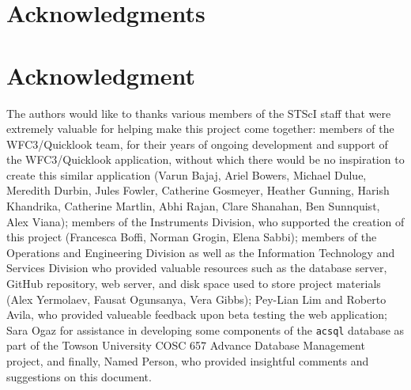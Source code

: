 \documentclass[10pt,journal,compsoc]{IEEEtran}
\begin{document}
\ifCLASSOPTIONcompsoc
  \section*{Acknowledgments}
\else
  \section*{Acknowledgment}
\fi
  The authors would like to thanks various members of the STScI staff that were extremely valuable for helping make this project come together: members of the WFC3/Quicklook team, for their years of
  ongoing development and support of the WFC3/Quicklook application, without which there would be no inspiration to create this similar application (Varun Bajaj, Ariel Bowers, Michael Dulue,
  Meredith Durbin, Jules Fowler, Catherine Gosmeyer, Heather Gunning, Harish Khandrika, Catherine Martlin, Abhi Rajan, Clare Shanahan, Ben Sunnquist, Alex Viana); members of the Instruments Division,
  who supported the creation of this project (Francesca Boffi, Norman Grogin, Elena Sabbi); members of the Operations and Engineering Division as well as the Information Technology and Services
  Division who provided valuable resources such as the database server, GitHub repository, web server, and disk space used to store project materials (Alex Yermolaev, Fausat Ogunsanya, Vera Gibbs);
  Pey-Lian Lim and Roberto Avila, who provided valueable feedback upon beta testing the web application; Sara Ogaz for assistance in developing some components of the \texttt{acsql} database as part
  of the Towson University COSC 657 Advance Database Management project, and finally, Named Person, who provided insightful comments and suggestions on this document.


\ifCLASSOPTIONcaptionsoff
  \newpage
\fi
\end{document}
